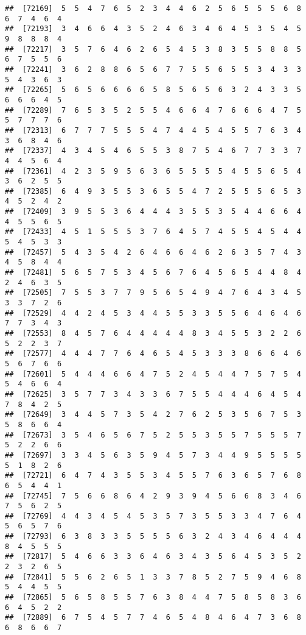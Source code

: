\documentclass[
]{book}
\begin{document}
\begin{verbatim}
##  [72169]  5  5  4  7  6  5  2  3  4  4  6  2  5  6  5  5  5  6  8  6  7  4  6  4
##  [72193]  3  4  6  6  4  3  5  2  4  6  3  4  6  4  5  3  5  4  5  9  8  8  8  4
##  [72217]  3  5  7  6  4  6  2  6  5  4  5  3  8  3  5  5  8  8  5  6  7  5  5  6
##  [72241]  3  6  2  8  8  6  5  6  7  7  5  5  6  5  5  3  4  3  3  5  4  3  6  3
##  [72265]  5  6  5  6  6  6  6  5  8  5  6  5  6  3  2  4  3  3  5  6  6  6  4  5
##  [72289]  7  6  5  3  5  2  5  5  4  6  6  4  7  6  6  6  4  7  5  5  7  7  7  6
##  [72313]  6  7  7  7  5  5  5  4  7  4  4  5  4  5  5  7  6  3  4  3  6  8  4  6
##  [72337]  4  3  4  5  4  6  5  5  3  8  7  5  4  6  7  7  3  3  7  4  4  5  6  4
##  [72361]  4  2  3  5  9  5  6  3  6  5  5  5  5  4  5  5  6  5  4  3  6  2  5  5
##  [72385]  6  4  9  3  5  5  3  6  5  5  4  7  2  5  5  5  6  5  3  4  5  2  4  2
##  [72409]  3  9  5  5  3  6  4  4  4  3  5  5  3  5  4  4  6  6  4  4  5  5  6  5
##  [72433]  4  5  1  5  5  5  3  7  6  4  5  7  4  5  5  4  5  4  4  5  4  5  3  3
##  [72457]  5  4  3  5  4  2  6  4  6  6  4  6  2  6  3  5  7  4  3  4  5  8  4  4
##  [72481]  5  6  5  7  5  3  4  5  6  7  6  4  5  6  5  4  4  8  4  2  4  6  3  5
##  [72505]  7  5  5  3  7  7  9  5  6  5  4  9  4  7  6  4  3  4  5  3  3  7  2  6
##  [72529]  4  4  2  4  5  3  4  4  5  5  3  3  5  5  6  4  6  4  6  7  7  3  4  3
##  [72553]  8  4  5  7  6  4  4  4  4  4  8  3  4  5  5  3  2  2  6  5  2  2  3  7
##  [72577]  4  4  4  7  7  6  4  6  5  4  5  3  3  3  8  6  6  4  6  5  6  7  6  6
##  [72601]  5  4  4  4  6  6  4  7  5  2  4  5  4  4  7  5  7  5  4  5  4  6  6  4
##  [72625]  3  5  7  7  3  4  3  3  6  7  5  5  4  4  4  6  4  5  4  7  8  4  2  5
##  [72649]  3  4  4  5  7  3  5  4  2  7  6  2  5  3  5  6  7  5  3  5  8  6  6  4
##  [72673]  3  5  4  6  5  6  7  5  2  5  5  3  5  5  7  5  5  5  7  5  2  2  6  6
##  [72697]  3  3  4  5  6  3  5  9  4  5  7  3  4  4  9  5  5  5  5  5  1  8  2  6
##  [72721]  6  4  7  4  3  5  5  3  4  5  5  7  6  3  6  5  7  6  8  6  5  4  4  1
##  [72745]  7  5  6  6  8  6  4  2  9  3  9  4  5  6  6  8  3  4  6  7  5  6  2  5
##  [72769]  4  4  3  4  5  4  5  3  5  7  3  5  5  3  3  4  7  6  4  5  6  5  7  6
##  [72793]  6  3  8  3  3  5  5  5  5  6  3  2  4  3  4  6  4  4  4  8  4  5  5  5
##  [72817]  5  4  6  6  3  3  6  4  6  3  4  3  5  6  4  5  3  5  2  2  3  2  6  5
##  [72841]  5  5  6  2  6  5  1  3  3  7  8  5  2  7  5  9  4  6  8  5  4  4  5  5
##  [72865]  5  6  5  8  5  5  7  6  3  8  4  4  7  5  8  5  8  3  6  6  4  5  2  2
##  [72889]  6  7  5  4  5  7  7  4  6  5  4  8  4  6  4  7  3  6  8  6  8  6  6  7

\end{verbatim}
\end{document}
